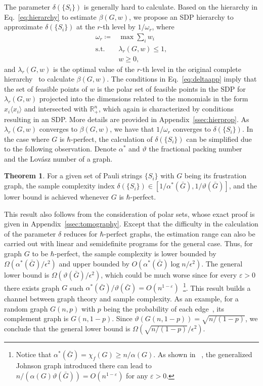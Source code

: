 \documentclass[
12pt,
prx,
aps,
reprint,
a4paper,
longbibliograph,
nofootinbib,
nobibnotes,
superscriptaddress
]{revtex4-2}
\theoremstyle{definition}
\newtheorem{theorem}{Theorem}
\begin{document}
The parameter $\delta(\{S_i\})$ is generally hard to calculate. 
Based on the hierarchy in Eq.~\eqref{eq:hierarchy} to estimate $\beta(G,w)$, we propose an SDP hierarchy to approximate $\delta(\{S_i\})$ at the $r$-th level by $1/\omega_r$, where
\begin{align}\label{eq:deltaapp}
	\omega_r \coloneqq &\max \sum\nolimits_i w_i\nonumber\\
	\mathrm{s.t.}\ & \lambda_r(G,w) \le 1,\nonumber\\
	     & w\ge 0,
\end{align}
and $\lambda_r(G,w)$ is the optimal value of the $r$-th level in the original complete hierarchy~\cite{moran2024Uncertainty} to calculate $\beta(G,w)$.
The conditions in Eq.~\eqref{eq:deltaapp} imply that
the set of feasible points of $w$  is the polar set of feasible points in the SDP for $\lambda_r(G,w)$ projected into the dimensions related to the monomials in the form $x_i\langle x_i\rangle$ and intersected with $\mathbb{R}^n_+$, which again is characterized by conditions resulting in an SDP. More details are provided in Appendix~\ref{ssec:hierprop}.
As $\lambda_r(G,w)$ converges to $\beta(G,w)$, we have that $1/\omega_r$ converges to $\delta(\{S_i\})$.
In the case where $G$ is $\hbar$-perfect, the calculation of $\delta(\{S_i\})$ can be simplified due to the following observation.
Denote $\alpha^*$ and $\vartheta$ the fractional packing number~\cite{schrijver1979fractional} and the Lov\'{a}sz number of a graph.
\begin{theorem}\label{ob:deltabs} 
	For a given set of Pauli strings $\{S_i\}$ with $G$ being its frustration graph, the sample complexity index
	 $ \delta(\{S_i\}) \in [1/\alpha^*(\bar{G}), 1/\vartheta(\bar{G})]$,
 and the lower bound is achieved whenever $G$ is $\hbar$-perfect. 
\end{theorem}
This result also follows from the consideration of polar sets, whose exact proof is given in Appendix~\ref{ssec:tomography}.
Except that the difficulty in the calculation of the parameter $\delta$ reduces for $\hbar$-perfect graphs,  the estimation range can also be carried out with linear and semidefinite programs for the general case.
Thus, for graph $G$ to be $\hbar$-perfect, the sample complexity is lower bounded by $\Omega(\alpha^*(\bar{G})/\epsilon^2)$ and upper bounded by $O(\alpha^*(\bar{G})\log n/\epsilon^2)$. The general lower bound is
$\Omega(\vartheta(\bar{G})/\epsilon^2)$, which could be much worse since for every $\varepsilon > 0$ there exists graph $G$ such $\alpha^*(\bar{G})/\vartheta(\bar{G}) = O(n^{1-\varepsilon})$~\cite{linz2024lsystemslovasznumber}\footnote{Notice that $\alpha^*(\bar{G}) = \chi_f(G) \ge n/\alpha(G)$. As shown in ~\cite[proof of Thm 1.6]{linz2024lsystemslovasznumber}, the generalized
Johnson graph introduced there can lead to $n/(\alpha(G) \vartheta(\bar{G})) = O(n^{1-\varepsilon})$ for any $\varepsilon > 0$. }. 
This result builds a channel between graph theory and sample complexity. As an example, for a random graph $G(n,p)$ with $p$ being the probability of each edge~\cite{coja2005lovasz}, its complement graph is $G(n,1-p)$. Since $\vartheta(G(n,1-p)) = \sqrt{n/(1-p)}$, we conclude that the general lower bound is $\Omega( \sqrt{n/(1-p)} /\epsilon^2)$. 
\end{document}
